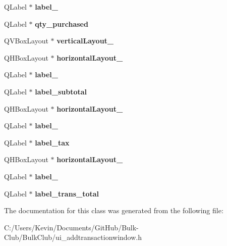 \begin{DoxyCompactItemize}
Q\+Label $\ast$ {\bfseries label\+\_}
\item 
\mbox{\label{class_ui___add_transaction_window_ac5c85631a087ff160b0c9df3f2480233}} 
Q\+Label $\ast$ {\bfseries qty\+\_\+purchased}
\item 
\mbox{\label{class_ui___add_transaction_window_af858b894907ef78604e1ad11e11fd0f7}} 
Q\+V\+Box\+Layout $\ast$ {\bfseries vertical\+Layout\+\_}
\item 
\mbox{\label{class_ui___add_transaction_window_af6d2fe0c437364b198cd4625d8b2ba02}} 
Q\+H\+Box\+Layout $\ast$ {\bfseries horizontal\+Layout\+\_}
\item 
\mbox{\label{class_ui___add_transaction_window_ae0edb64c8dee74c312bb63809abdb0b7}} 
Q\+Label $\ast$ {\bfseries label\+\_}
\item 
\mbox{\label{class_ui___add_transaction_window_ae348373f045c234fe6319cbd8102595a}} 
Q\+Label $\ast$ {\bfseries label\+\_\+subtotal}
\item 
\mbox{\label{class_ui___add_transaction_window_a7fb8c70e1c9a5c5b3e0165c1aff50638}} 
Q\+H\+Box\+Layout $\ast$ {\bfseries horizontal\+Layout\+\_}
\item 
\mbox{\label{class_ui___add_transaction_window_afc8703296723e6a4ee63a901d6400e67}} 
Q\+Label $\ast$ {\bfseries label\+\_}
\item 
\mbox{\label{class_ui___add_transaction_window_a73c8d3fc21447f016273fef961684e3a}} 
Q\+Label $\ast$ {\bfseries label\+\_\+tax}
\item 
\mbox{\label{class_ui___add_transaction_window_a6fbbaaa558c5c299b330eb0dc06fc9c0}} 
Q\+H\+Box\+Layout $\ast$ {\bfseries horizontal\+Layout\+\_}
\item 
\mbox{\label{class_ui___add_transaction_window_a1ab8bdeb59fd27f2924466e4b7613f29}} 
Q\+Label $\ast$ {\bfseries label\+\_}
\item 
\mbox{\label{class_ui___add_transaction_window_ad9d28a14065efb6cfad69c7fa95f3b41}} 
Q\+Label $\ast$ {\bfseries label\+\_\+trans\+\_\+total}
\end{DoxyCompactItemize}


The documentation for this class was generated from the following file\+:\begin{DoxyCompactItemize}
\item 
C\+:/\+Users/\+Kevin/\+Documents/\+Git\+Hub/\+Bulk-\/\+Club/\+Bulk\+Club/ui\+\_\+addtransactionwindow.\+h\end{DoxyCompactItemize}

